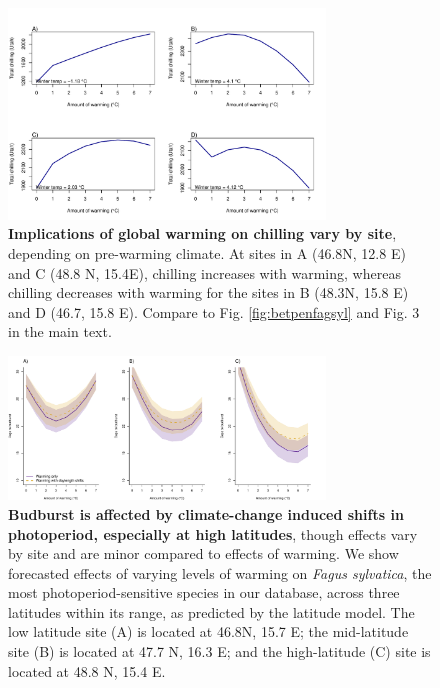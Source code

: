 \documentclass{article}
\begin{document}
\begin{figure}[h!]
\centering
\noindent \includegraphics[width=0.75\textwidth]{..//..//analyses/bb_analysis/figures/forecasting/chillforecastbothspp_1_7_degwarm.pdf}
\caption{\textbf{Implications of global warming on chilling vary by site}, depending on pre-warming climate. At sites in A (46.8\degree N, 12.8 \degree E) and C (48.8 \degree N, 15.4\degree E), chilling increases with warming, whereas chilling decreases with warming for the sites in B (48.3\degree N, 15.8 \degree E) and D (46.7, 15.8 \degree E). Compare to Fig. \ref{fig:betpenfagsyl} and Fig. 3 in the main text.}
\label{fig:chillfore}
\end{figure}

\begin{figure}[h!]
\centering
\noindent \includegraphics[width=0.75\textwidth]{..//..//analyses/bb_analysis/figures/forecasting/fagsyl_3lats.pdf}
\caption{\textbf{Budburst is affected by climate-change induced shifts in photoperiod, especially at high latitudes}, though effects vary by site and are minor compared to effects of warming. We show forecasted effects of varying levels of warming on \emph{Fagus sylvatica}, the most photoperiod-sensitive species in our database, across three latitudes within its range, as predicted by the latitude model. The low latitude site (A) is  located at 46.8\degree N, 15.7 \degree E; the mid-latitude site (B) is located at 47.7 \degree N, 16.3 \degree E; and the high-latitude (C) site is located at 48.8 \degree N, 15.4 \degree E.}
\label{fig:fagsyllat}
\end{figure}
\end{document}
